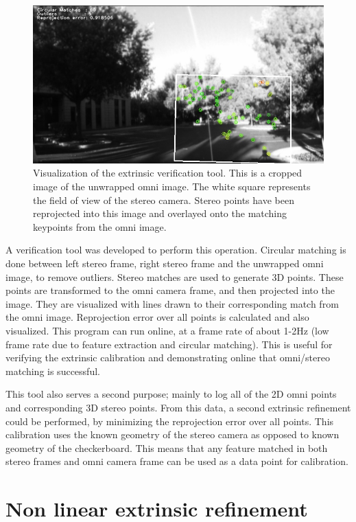 \begin{figure}[h!]
  \centering
    \includegraphics[width=1.0\textwidth]{chapters/images/circ_matches}
  \caption{Visualization of the extrinsic verification tool. This is a cropped image of the unwrapped omni image.  The white square represents the field of view of the stereo camera.  Stereo points have been reprojected into this image and overlayed onto the matching keypoints from the omni image. }
  \label{fig:circ_matches}
\end{figure}

A verification tool was developed to perform this operation.  Circular matching is done between left stereo frame, right stereo frame and the unwrapped omni image, to remove outliers.  Stereo matches are used to generate 3D points.  These points are transformed to the omni camera frame, and then projected into the image.  They are visualized with lines drawn to their corresponding match from the omni image.  Reprojection error over all points is calculated and also visualized.  This program can run online, at a frame rate of about 1-2Hz (low frame rate due to feature extraction and circular matching).  This is useful for verifying the extrinsic calibration and demonstrating online that omni/stereo matching is successful.

This tool also serves a second purpose; mainly to log all of the 2D omni points and corresponding 3D stereo points.  From this data, a second extrinsic refinement could be performed, by minimizing the reprojection error over all points.  This calibration uses the known geometry of the stereo camera as opposed to known geometry of the checkerboard.  This means that any feature matched in both stereo frames and omni camera frame can be used as a data point for calibration.

\section{Non linear extrinsic refinement}
\label{sec:g2o_extrinsic_cal}

